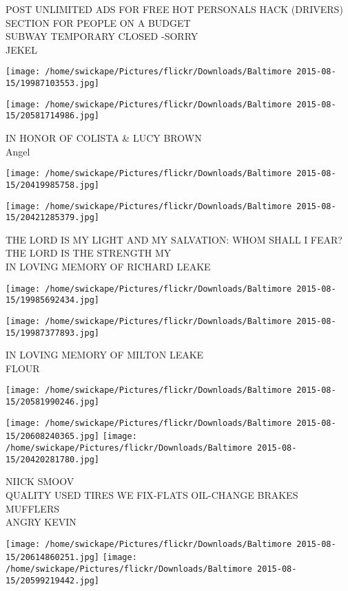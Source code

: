 \documentclass[10pt,letterpaper]{article}
\begin{document}
POST UNLIMITED ADS FOR FREE HOT PERSONALS HACK (DRIVERS) SECTION FOR PEOPLE ON A BUDGET\\
SUBWAY TEMPORARY CLOSED {-}SORRY\\
JEKEL
\pagebreak

\texttt{[image: /home/swickape/Pictures/flickr/Downloads/Baltimore 2015-08-15/19987103553.jpg]}

\vspace{0.25in}
\texttt{[image: /home/swickape/Pictures/flickr/Downloads/Baltimore 2015-08-15/20581714986.jpg]}

IN HONOR OF COLISTA \& LUCY BROWN\\
Angel
\pagebreak

\texttt{[image: /home/swickape/Pictures/flickr/Downloads/Baltimore 2015-08-15/20419985758.jpg]}

\vspace{0.25in}
\texttt{[image: /home/swickape/Pictures/flickr/Downloads/Baltimore 2015-08-15/20421285379.jpg]}

THE LORD IS MY LIGHT AND MY SALVATION: WHOM SHALL I FEAR?  THE LORD IS THE STRENGTH MY\\
IN LOVING MEMORY OF RICHARD LEAKE
\pagebreak

\texttt{[image: /home/swickape/Pictures/flickr/Downloads/Baltimore 2015-08-15/19985692434.jpg]}

\vspace{0.25in}
\texttt{[image: /home/swickape/Pictures/flickr/Downloads/Baltimore 2015-08-15/19987377893.jpg]}

IN LOVING MEMORY OF MILTON LEAKE\\
FLOUR
\pagebreak

\texttt{[image: /home/swickape/Pictures/flickr/Downloads/Baltimore 2015-08-15/20581990246.jpg]}

\vspace{0.25in}
\texttt{[image: /home/swickape/Pictures/flickr/Downloads/Baltimore 2015-08-15/20608240365.jpg]}
\texttt{[image: /home/swickape/Pictures/flickr/Downloads/Baltimore 2015-08-15/20420281780.jpg]}

NIICK SMOOV\\
QUALITY USED TIRES WE FIX{-}FLATS OIL{-}CHANGE BRAKES MUFFLERS\\
ANGRY KEVIN
\pagebreak

\texttt{[image: /home/swickape/Pictures/flickr/Downloads/Baltimore 2015-08-15/20614860251.jpg]}
\texttt{[image: /home/swickape/Pictures/flickr/Downloads/Baltimore 2015-08-15/20599219442.jpg]}
\end{document}
